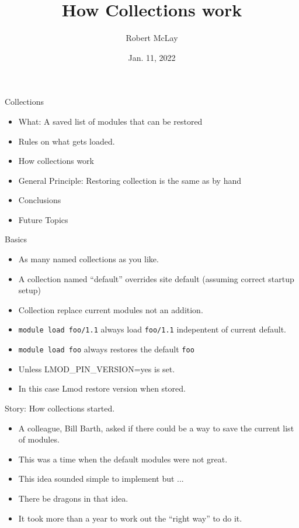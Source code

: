 \documentclass{beamer}
\begin{document}
\title[Lmod]{How Collections work}
\author{Robert McLay} 
\date{Jan. 11, 2022}

\frame{\titlepage} 


\begin{frame}{Collections}
  \begin{itemize}
    \item What: A saved list of modules that can be restored
    \item Rules on what gets loaded.
    \item How collections work
    \item General Principle: Restoring collection is the same as by hand
    \item Conclusions
    \item Future Topics
  \end{itemize}
\end{frame}

\begin{frame}{Basics}
  \begin{itemize}
    \item As many named collections as you like.
    \item A collection named ``default'' overrides site default
      (assuming correct startup setup)
    \item Collection replace current modules not an addition.
    \item \texttt{module load foo/1.1} always load \texttt{foo/1.1}
      indepentent of current default.
    \item \texttt{module load foo} always restores the default
      \texttt{foo}
    \item Unless LMOD_PIN_VERSION=yes is set. 
    \item In this case Lmod restore version when stored.
  \end{itemize}
\end{frame}


\begin{frame}{Story: How collections started.}
  \begin{itemize}
    \item A colleague, Bill Barth, asked if there could be a way to
      save the current list of modules.
    \item This was a time when the default modules were not great.
    \item This idea sounded simple to implement but ...
    \item There be dragons in that idea.
    \item It took more than a year to work out the ``right way'' to do it.
  \end{itemize}
\end{frame}
\end{document}
